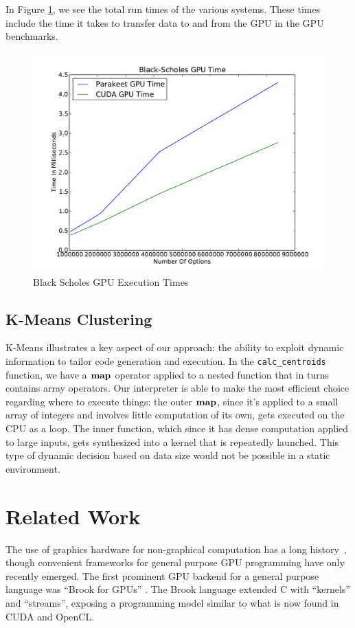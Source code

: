 \documentclass[preprint]{sigplanconf}
\begin{document}
In Figure \ref{BSResults}, we see the total run times of the various systems.
These times include the time it takes to transfer data to and from the GPU in
the GPU benchmarks.  

\begin{figure}
\includegraphics[scale=0.45]{BSGPU.pdf}
\caption{Black Scholes GPU Execution Times}
\label{BSResults}
\end{figure}

\subsection{K-Means Clustering}

K-Means illustrates a key aspect of our approach: the ability to exploit
dynamic information to tailor code generation and execution.  In the
\texttt{calc\_centroids} function, we have a $\mbox{\textbf{map}}$ operator applied to a
nested function that in turns contains array operators.  Our interpreter is
able to make the most efficient choice regarding where to execute things: the
outer $\mbox{\textbf{map}}$, since it's applied to a small array of integers and involves
little computation of its own, gets executed on the CPU as a loop.  The inner
function, which since it has dense computation applied to large inputs, gets
synthesized into a kernel that is repeatedly launched.  This type of dynamic
decision based on data size would not be possible in a static environment.

\section{Related Work}
\label{RelatedWork}
The use of graphics hardware for non-graphical computation has a  long
history~\cite{Lengyel90}, though convenient frameworks for general purpose GPU
programming have only recently emerged. The first prominent GPU backend for a
general purpose language was ``Brook for GPUs'' \cite{Buck04}. The Brook
language extended C with ``kernels'' and
``streams'', exposing a programming model similar to what is now found in CUDA
and OpenCL.
\end{document}
